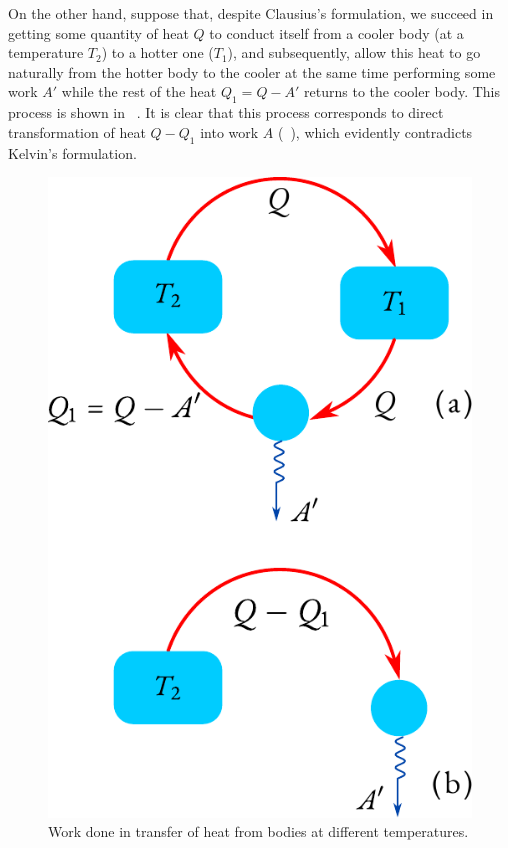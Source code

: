 On the other hand, suppose that, despite Clausius's formulation, we succeed in getting some quantity of heat $Q$ to conduct itself from a cooler body (at a temperature $T_{2}$) to a hotter one ($T_{1}$), and subsequently, allow this heat to go naturally from the hotter body to the cooler at the same time performing some work $A'$ while the rest of the heat $Q_{1} = Q - A'$ returns to the cooler body. This process is shown in ~. It is clear that this process corresponds to direct transformation of heat $Q - Q_{1}$ into work $A$ (~), which evidently contradicts Kelvin's formulation.

\begin{figure}
\centering
\includegraphics[width=\linewidth]{figures/perp.pdf}
\caption{Work done in transfer of heat from bodies at different temperatures.}
\label{perp}
\end{figure}

